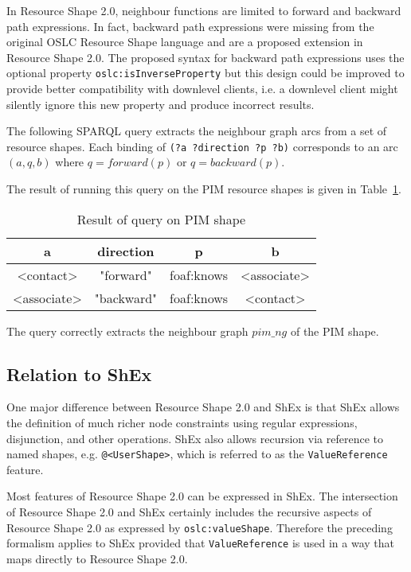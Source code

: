\documentclass{article}
\begin{document}
In Resource Shape 2.0, neighbour functions are limited to forward and backward path expressions.
In fact, backward path expressions were missing from the original OSLC Resource Shape language and are a proposed
extension in Resource Shape 2.0. The proposed syntax for backward path expressions uses the optional property
{\tt oslc:isInverseProperty} but this design could be improved to provide better compatibility with downlevel clients,
i.e. a downlevel client might silently ignore this new property and produce incorrect results.

The following SPARQL query extracts the neighbour graph arcs from a set of resource shapes.
 Each binding of {\tt (?a ?direction ?p ?b)} corresponds to an arc $(a, q, b)$ where $q=forward(p)$ or $q=backward(p)$.


The result of running this query on the PIM resource shapes is given in Table~\ref{result}.
\begin{table}[h]
\begin{center}
\begin{tt}
\begin{tabular}{|c|c|c|c|}
\hline
a			& direction	& p			& b \\
\hline
<contact>		& "forward"	& foaf:knows	& <associate> \\
<associate>	& "backward"	& foaf:knows	& <contact> \\
\hline
\end{tabular}
\end{tt}
\end{center}
\caption{Result of query on PIM shape}
\label{result}
\end{table}

The query correctly extracts the neighbour graph $pim\_ng$ of the PIM shape.

\subsection{Relation to ShEx}

One major difference between Resource Shape 2.0 and ShEx is that ShEx allows the definition of
much richer node constraints using regular expressions, disjunction, and other operations.
ShEx also allows recursion via reference to named shapes, e.g. {\tt @<UserShape>},
which is referred to as the {\tt ValueReference} feature.

Most features of Resource Shape 2.0 can be expressed in ShEx. The intersection
of Resource Shape 2.0 and ShEx certainly includes the recursive aspects of Resource Shape 2.0 as
expressed by {\tt oslc:valueShape}.
Therefore the preceding formalism applies to ShEx provided that {\tt ValueReference} is used in a way that
maps directly to Resource Shape 2.0.
\end{document}
